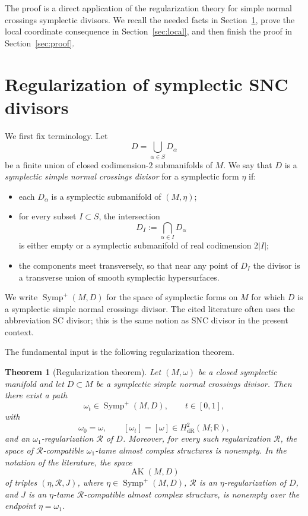 \documentclass[11pt]{article}
\newtheorem{theorem}{Theorem}
\theoremstyle{definition}
\begin{document}
The proof is a direct application of the regularization theory for simple normal crossings symplectic divisors.  We recall the needed facts in Section~\ref{sec:regularization}, prove the local coordinate consequence in Section~\ref{sec:local}, and then finish the proof in Section~\ref{sec:proof}.

\section{Regularization of symplectic SNC divisors}\label{sec:regularization}

We first fix terminology.  Let
\[
D=\bigcup_{\alpha\in S}D_\alpha
\]
be a finite union of closed codimension-\(2\) submanifolds of \(M\).  We say that \(D\) is a \emph{symplectic simple normal crossings divisor} for a symplectic form \(\eta\) if:
\begin{itemize}
\item each \(D_\alpha\) is a symplectic submanifold of \((M,\eta)\);
\item for every subset \(I\subset S\), the intersection
\[
D_I:=\bigcap_{\alpha\in I}D_\alpha
\]
is either empty or a symplectic submanifold of real codimension \(2|I|\);
\item the components meet transversely, so that near any point of \(D_I\) the divisor is a transverse union of smooth symplectic hypersurfaces.
\end{itemize}
We write \(\operatorname{Symp}^+(M,D)\) for the space of symplectic forms on \(M\) for which \(D\) is a symplectic simple normal crossings divisor.  The cited literature often uses the abbreviation SC divisor; this is the same notion as SNC divisor in the present context.

The fundamental input is the following regularization theorem.

\begin{theorem}[Regularization theorem]\label{thm:regularization}
Let \((M,\omega)\) be a closed symplectic manifold and let \(D\subset M\) be a symplectic simple normal crossings divisor.  Then there exist a path
\[
\omega_t\in \operatorname{Symp}^+(M,D),\qquad t\in[0,1],
\]
with
\[
\omega_0=\omega,\qquad [\omega_t]=[\omega]\in H^2_{\mathrm{dR}}(M;\mathbb R),
\]
and an \(\omega_1\)-regularization \(\mathcal R\) of \(D\).  Moreover, for every such regularization \(\mathcal R\), the space of \(\mathcal R\)-compatible \(\omega_1\)-tame almost complex structures is nonempty.  In the notation of the literature, the space
\[
\operatorname{AK}(M,D)
\]
of triples \((\eta,\mathcal R,J)\), where \(\eta\in\operatorname{Symp}^+(M,D)\), \(\mathcal R\) is an \(\eta\)-regularization of \(D\), and \(J\) is an \(\eta\)-tame \(\mathcal R\)-compatible almost complex structure, is nonempty over the endpoint \(\eta=\omega_1\).
\end{theorem}
\end{document}
